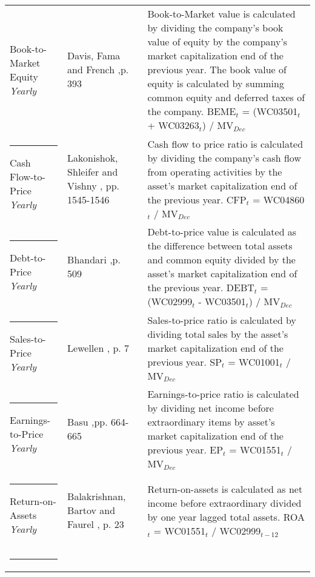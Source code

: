\documentclass[12pt]{article}
\begin{document}
\begin{appendices}
{{\begin{xltabular}{\textwidth}{ >{\raggedright\arraybackslash}p{0.23\textwidth} >{\raggedright\arraybackslash}p{0.2\textwidth} X}
Book-to-Market Equity \newline \emph{Yearly} 	& Davis, Fama and French \citeyearpar{Davis2000},\newline p. 393	&  Book-to-Market value is calculated by dividing the company's book value of equity by the company's market capitalization end of the previous year. The book value of equity is calculated by summing common equity and deferred taxes of the company. \newline BEME$_t$ = (WC03501$_{t}$ + WC03263$_{t}$) /  MV$_{Dec}$\\ \rule{-1ex}{3ex}
Cash Flow-to-Price \newline \emph{Yearly}	& Lakonishok, Shleifer and Vishny  \citeyearpar{Lakonishok1994}, \newline pp. 1545-1546 & Cash flow to price ratio is calculated by dividing the company's cash flow from operating activities by the asset's market capitalization end of the previous year. \newline CFP$_t$ = WC04860$_{t}$ / MV$_{Dec}$\\ \rule{-1ex}{3ex}
Debt-to-Price \newline \emph{Yearly}			& Bhandari \citeyearpar{Bhandari1988},\newline p. 509				& Debt-to-price value is calculated as the difference between total assets and common equity divided by the asset's market capitalization end of the previous year. \newline DEBT$_t$ = (WC02999$_{t}$ - WC03501$_{t}$) / MV$_{Dec}$\\ \rule{-1ex}{3ex}
Sales-to-Price 	\newline \emph{Yearly}		& Lewellen \citeyearpar{Lewellen2015}, \newline p. 7				& Sales-to-price ratio is calculated by dividing total sales by the asset's market capitalization end of the previous year. \newline SP$_t$ = WC01001$_{t}$ / MV$_{Dec}$ \\ \rule{-1ex}{3ex}
Earnings-to-Price \newline \emph{Yearly}		& Basu \citeyearpar{Basu1977},\newline pp. 664-665				& Earnings-to-price ratio is calculated by dividing net income before extraordinary items by asset's market capitalization end of the previous year. \newline EP$_t$ = WC01551$_{t}$ / MV$_{Dec}$ \\ \rule{-1ex}{3ex}
Return-on-Assets \newline \emph{Yearly}		& Balakrishnan, Bartov and Faurel \citeyearpar{BALAKRISHNAN2010}, p. 23	& Return-on-assets is calculated as net income before extraordinary divided by one year lagged total assets. \newline ROA$_t$ = WC01551$_{t}$ / WC02999$_{t-12}$ \\ \rule{-1ex}{3ex}

\end{xltabular}}}
\end{appendices}
\end{document}
